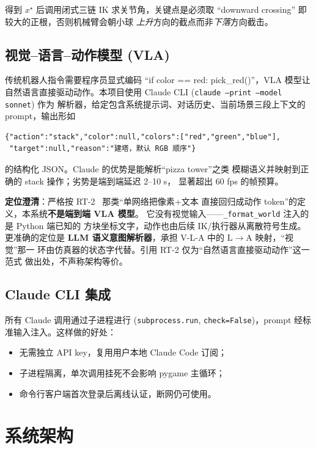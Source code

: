 \documentclass[12pt, a4paper, UTF8]{ctexart}
\begin{document}
得到 $x^\star$ 后调用闭式三链 IK 求关节角，关键点是必须取
``downward crossing'' 即较大的正根，否则机械臂会朝小球
\textit{上升}方向的截点而非\textit{下落}方向截击。

\subsection{视觉--语言--动作模型 (VLA)}
传统机器人指令需要程序员显式编码 ``if color == red:
pick\_red()''，VLA 模型让自然语言直接驱动动作。本项目使用
Claude CLI (\texttt{claude --print --model sonnet}) 作为
解析器，给定包含系统提示词、对话历史、当前场景三段上下文的
prompt，输出形如
\begin{lstlisting}[language={}, basicstyle=\ttfamily\small]
{"action":"stack","color":null,"colors":["red","green","blue"],
 "target":null,"reason":"建塔，默认 RGB 顺序"}
\end{lstlisting}
的结构化 JSON。Claude 的优势是能解析``pizza tower''之类
模糊语义并映射到正确的 stack 操作；劣势是端到端延迟 2--10 s，
显著超出 60 fps 的帧预算。

\textbf{定位澄清}：严格按 RT-2~\cite{vla} 那类``单网络把像素+文本
直接回归成动作 token''的定义，本系统\textbf{不是端到端 VLA 模型}。
它没有视觉输入——\texttt{\_format\_world} 注入的是 Python 端已知的
方块坐标文字，动作也由后续 IK/执行器从离散符号生成。更准确的定位是
\textbf{LLM 语义意图解析器}，承担 V-L-A 中的 L$\to$A 映射，``视觉''那一
环由仿真器的状态字代替。引用 RT-2 仅为``自然语言直接驱动动作''这一范式
做出处，不声称架构等价。

\subsection{Claude CLI 集成}
所有 Claude 调用通过子进程进行 (\texttt{subprocess.run},
\texttt{check=False})，prompt 经标准输入注入。这样做的好处：
\begin{itemize}[leftmargin=*, itemsep=0pt]
  \item 无需独立 API key，复用用户本地 Claude Code 订阅；
  \item 子进程隔离，单次调用挂死不会影响 pygame 主循环；
  \item 命令行客户端首次登录后离线认证，断网仍可使用。
\end{itemize}

\section{系统架构}\label{sec:arch}
\end{document}
